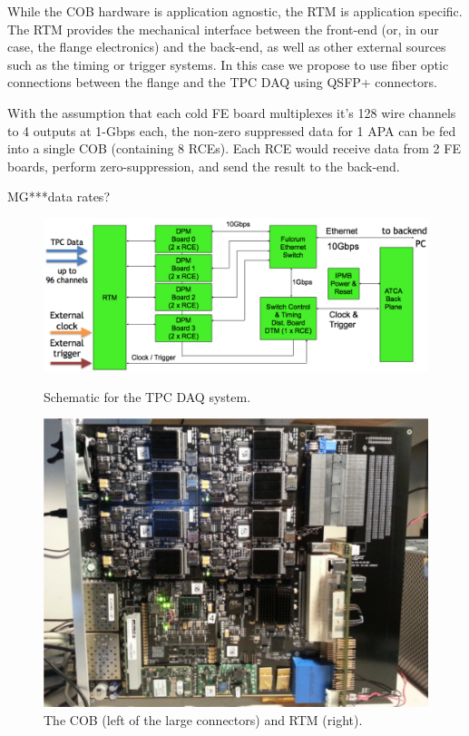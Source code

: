 While the COB hardware is application agnostic,  the RTM is application specific. The RTM provides the mechanical interface between the front-end (or, in our case, the flange electronics) and the back-end, as well as other external sources such as the timing or trigger systems.  In this case  we propose to use fiber optic connections between the flange and the TPC DAQ using QSFP+ connectors. 

With the assumption that each cold FE board multiplexes it's 128 wire channels to 4 outputs at 1-Gbps each, the non-zero suppressed data for 1 APA can be fed into a single COB (containing 8 RCEs).  Each RCE would receive data from 2 FE boards, perform zero-suppression, and send the result to the back-end.  

MG***data rates?  

\begin{figure}[tb]
  \centering
\includegraphics[scale=0.4]{figures/rce-block.pdf}
\label{fig:rceblock}
  \caption{Schematic for the TPC DAQ system.   }
\end{figure}


\begin{figure}[hbt]
  \includegraphics[scale=0.6]{figures/COB-gen3.pdf}
  \caption{\label{fig:cob} The COB (left of the large connectors) and RTM (right).  }
\end{figure}



